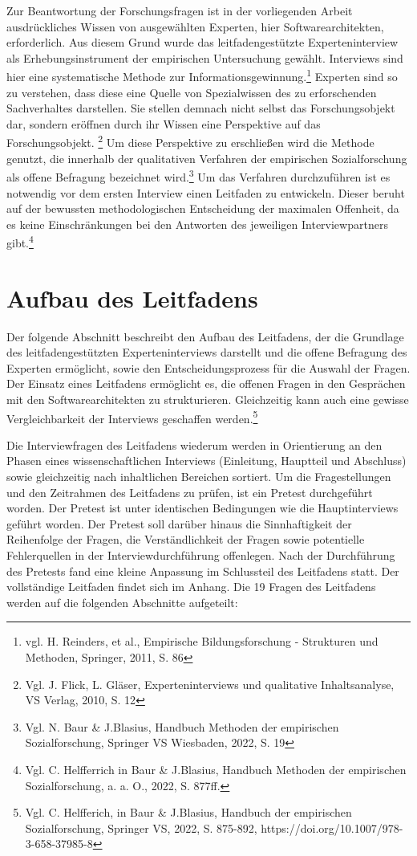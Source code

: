 Zur Beantwortung der Forschungsfragen ist in der vorliegenden Arbeit ausdrückliches Wissen von ausgewählten Experten, hier Softwarearchitekten, erforderlich. Aus diesem Grund wurde das leitfadengestützte Experteninterview als Erhebungsinstrument der empirischen Untersuchung gewählt. Interviews sind hier eine systematische Methode zur Informationsgewinnung.\footnote{vgl. H. Reinders, et al., Empirische Bildungsforschung - Strukturen und Methoden, Springer, 2011, S. 86}
 Experten sind so zu verstehen, dass diese eine Quelle von Spezialwissen des zu erforschenden Sachverhaltes darstellen. Sie stellen demnach nicht selbst das Forschungsobjekt dar, sondern eröffnen durch ihr Wissen eine Perspektive auf das Forschungsobjekt. \footnote{Vgl. J. Flick, L. Gläser, Experteninterviews und qualitative Inhaltsanalyse, VS Verlag, 2010, S. 12 } Um diese Perspektive zu erschließen wird die Methode genutzt, die innerhalb der qualitativen Verfahren der empirischen Sozialforschung als offene Befragung bezeichnet wird.\footnote{Vgl. N. Baur \& J.Blasius, Handbuch Methoden der empirischen Sozialforschung, Springer VS Wiesbaden, 2022, S. 19} Um das Verfahren durchzuführen ist es notwendig vor dem ersten Interview einen Leitfaden zu entwickeln. Dieser beruht auf der bewussten methodologischen Entscheidung der maximalen Offenheit, da es keine Einschränkungen bei den Antworten des jeweiligen Interviewpartners gibt.\footnote{Vgl. C. Helfferrich in Baur \& J.Blasius, Handbuch Methoden der empirischen Sozialforschung,  a. a. O., 2022, S. 877ff. }

\section{Aufbau des Leitfadens}
Der folgende Abschnitt beschreibt den Aufbau des Leitfadens, der die Grundlage des leitfadengestützten Experteninterviews darstellt und die offene Befragung des Experten ermöglicht, sowie den Entscheidungsprozess für die Auswahl der Fragen.
Der Einsatz eines Leitfadens ermöglicht es, die offenen Fragen in den Gesprächen mit den Softwarearchitekten zu strukturieren. Gleichzeitig kann auch eine gewisse Vergleichbarkeit der Interviews geschaffen werden.\footnote{Vgl. C. Helfferich, in Baur \& J.Blasius, Handbuch der empirischen Sozialforschung, Springer VS, 2022, S. 875-892, https://doi.org/10.1007/978-3-658-37985-8}

Die Interviewfragen des Leitfadens wiederum werden in Orientierung an den Phasen eines wissenschaftlichen Interviews (Einleitung, Hauptteil und Abschluss) sowie gleichzeitig nach inhaltlichen Bereichen sortiert. 
Um die Fragestellungen und den Zeitrahmen des Leitfadens zu prüfen, ist ein Pretest durchgeführt worden. Der Pretest ist unter identischen Bedingungen wie die Hauptinterviews geführt worden. Der Pretest soll darüber hinaus die Sinnhaftigkeit der Reihenfolge der Fragen, die Verständlichkeit der Fragen sowie potentielle Fehlerquellen in der Interviewdurchführung offenlegen. Nach der Durchführung des Pretests fand eine kleine Anpassung im Schlussteil des Leitfadens statt. 
Der vollständige Leitfaden findet sich im Anhang. Die 19 Fragen des Leitfadens werden auf die folgenden Abschnitte aufgeteilt:

